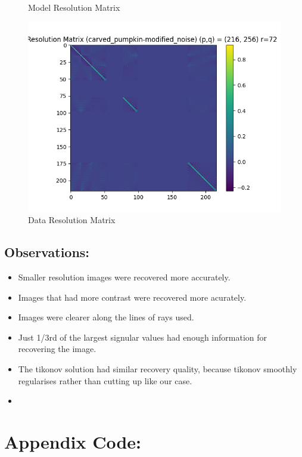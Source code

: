 \documentclass{article}
\begin{document}
\begin{itemize}
\begin{figure}[h]
        \caption{Model Resolution Matrix}
    \end{figure}
    \begin{figure}[h]
        \centering
        \includegraphics[width=1\textwidth]{images/outputs/datares/carved_pumpkin-modified_noise.png}
        \caption{Data Resolution Matrix}
    \end{figure}
    \clearpage



\end{itemize}

\subsection{Observations:}
\begin{itemize}
    \item Smaller resolution images were recovered more accurately.
    \item Images that had more contrast were recovered more acurately.
    \item Images were clearer along the lines of rays used.
    \item Just 1/3rd of the largest signular values had enough information for recovering the image.
    \item The tikonov solution had similar recovery quality, because tikonov smoothly regularises rather than cutting up like our case.
    \item 
\end{itemize}

\section{Appendix Code:}
\end{document}
